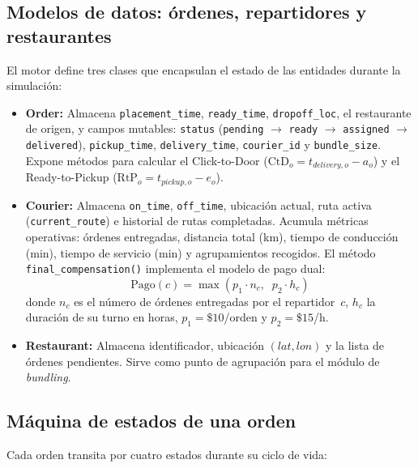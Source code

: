 \documentclass[12pt,letterpaper,oneside]{book}
\begin{document}
	\subsection{Modelos de datos: órdenes, repartidores y restaurantes}

	El motor define tres clases que encapsulan el estado de las entidades durante la simulación:

	\begin{itemize}
		\item \textbf{Order:} Almacena \texttt{placement\_time}, \texttt{ready\_time}, 
		\texttt{dropoff\_loc}, el restaurante de origen, y campos mutables: \texttt{status} 
		(\texttt{pending} $\to$ \texttt{ready} $\to$ \texttt{assigned} $\to$ \texttt{delivered}), 
		\texttt{pickup\_time}, \texttt{delivery\_time}, \texttt{courier\_id} y \texttt{bundle\_size}. Expone métodos 
		para calcular el Click-to-Door ($\text{CtD}_o = t_{delivery,o} - a_o$) y el 
		Ready-to-Pickup ($\text{RtP}_o = t_{pickup,o} - e_o$).

		\item \textbf{Courier:} Almacena \texttt{on\_time}, \texttt{off\_time}, ubicación actual, 
		ruta activa (\texttt{current\_route}) e historial de rutas completadas. Acumula métricas 
		operativas: órdenes entregadas, distancia total (km), tiempo de conducción (min),
		tiempo de servicio (min) y agrupamientos recogidos. El método \texttt{final\_compensation()} implementa el modelo 
		de pago dual:
		\begin{equation}
			\text{Pago}(c) = \max\!\left(p_1 \cdot n_c, \;\; p_2 \cdot h_c\right)
			\label{eq:compensation}
		\end{equation}
		donde $n_c$ es el número de órdenes entregadas por el repartidor~$c$, $h_c$ la
		duración de su turno en horas, $p_1 = \$10$/orden y $p_2 = \$15$/h.

		\item \textbf{Restaurant:} Almacena identificador, ubicación $(lat, lon)$ y la lista 
		de órdenes pendientes. Sirve como punto de agrupación para el módulo de 
		\textit{bundling}.
	\end{itemize}

	\subsection{Máquina de estados de una orden}

	Cada orden transita por cuatro estados durante su ciclo de vida:
\end{document}
